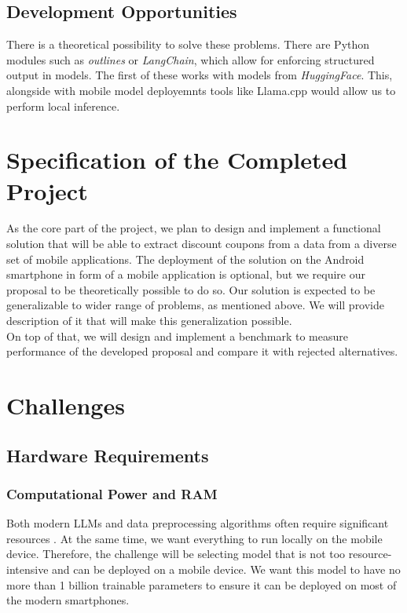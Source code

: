 \documentclass[12pt]{article}
\begin{document}
\subsection*{Development Opportunities}
There is a theoretical possibility to solve these problems. There are Python modules such as \textit{outlines}\cite{willard2023efficient} or \textit{LangChain}\cite{Chase_LangChain_2022}, which allow for enforcing structured output in models. The first of these works with models from \textit{HuggingFace}. This, alongside with mobile model deployemnts tools like Llama.cpp\cite{llamacpp} would allow us to perform local inference.

\section*{Specification of the Completed Project}
As the core part of the project, we plan to design and implement a functional solution that will be able to extract discount coupons from a data from a diverse set of mobile applications. The deployment of the solution on the Android smartphone in form of a mobile application is optional, but we require our proposal to be theoretically possible to do so. Our solution is expected to be generalizable to wider range of problems, as mentioned above. We will provide description of it that will make this generalization possible.\\
On top of that, we will design and implement a benchmark to measure performance of the developed proposal and compare it with rejected alternatives.

\section*{Challenges}

\subsection*{Hardware Requirements}

\subsubsection*{Computational Power and RAM}
Both modern LLMs and data preprocessing algorithms often require significant resources \cite{LLMmobile2024}. At the same time, we want everything to run locally on the mobile device. Therefore, the challenge will be selecting model that is not too resource-intensive and can be deployed on a mobile device. We want this model to have no more than 1 billion trainable parameters to ensure it can be deployed on most of the modern smartphones\cite{li2025palmbenchcomprehensivebenchmarkcompressed}.
\end{document}
